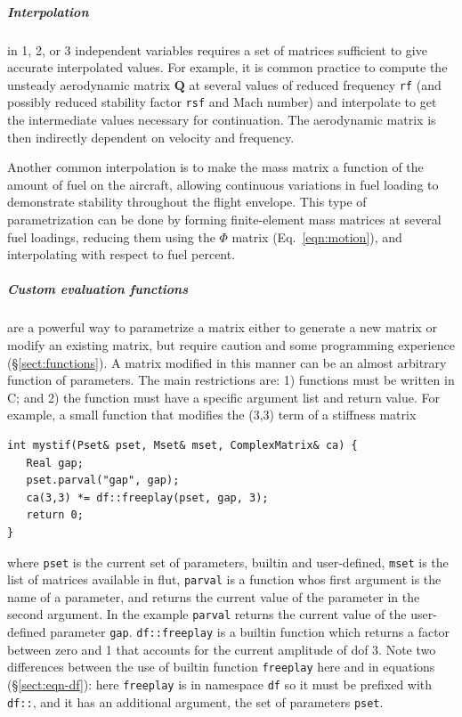\documentclass[10pt,openany,twoside]{book}
\numberwithin{equation}{section}   %
\def\Cpp{{C\nolinebreak[4]\hspace{-.05em}\raisebox{.4ex}{\tiny\bf ++}}\:}
\newcommand{\Cmd}[1]{{\sf #1}}
\newcommand{\Code}[1]{{\small\tt #1}}
\newcommand{\Matrix}[1]{\boldsymbol{#1}}
\newcommand{\Sectref}[1]{\S\ref{#1}}
\newcommand{\Eqn}[1]{Eq.\ \ref{#1}}
\begin{document}
\subparagraph{Interpolation} in 1, 2, or 3 independent variables
requires a set of matrices sufficient to give accurate interpolated
values.
For example, it is common practice to compute
the unsteady aerodynamic matrix $\Matrix{Q}$ at several values of
reduced frequency \Code{rf} (and possibly reduced stability factor
\Code{rsf} and Mach number) and interpolate to get the
intermediate values necessary for continuation. The aerodynamic matrix is
then indirectly dependent on velocity and frequency.

Another common interpolation is to make the mass matrix a function
of the amount of fuel on the aircraft, allowing continuous variations
in fuel loading to demonstrate stability throughout the flight envelope.
This type of parametrization can be done by forming finite-element
mass matrices at several fuel loadings, reducing them using the
$\Phi$ matrix (\Eqn{eqn:motion}), and interpolating with respect to
\index{=Phi@$\Matrix{\Phi}$!parametrizing with}
fuel percent.

\subparagraph{Custom evaluation functions} are a
powerful way to parametrize a matrix either to generate a new matrix
or modify an existing matrix,
but require caution and some programming experience (\Sectref{sect:functions}).
A matrix modified in this manner can be an almost arbitrary function
of parameters. The main restrictions are: 1) functions must be written in \Cpp;
and 2) the function must have a specific argument list and return value.
For example, a small function that modifies the (3,3) term of a stiffness matrix
\begin{lstlisting}
int mystif(Pset& pset, Mset& mset, ComplexMatrix& ca) {
   Real gap;
   pset.parval("gap", gap);
   ca(3,3) *= df::freeplay(pset, gap, 3);
   return 0;
}
\end{lstlisting}
where \Code{pset} is the current set of parameters, builtin and user-defined,
\Code{mset} is the list of matrices available in \Cmd{flut},
\Code{parval} is a function whos first argument is the name of a parameter,
and returns the current value of the parameter in the second argument.
In the example \Code{parval} returns the current value of the
user-defined parameter \Code{gap}.
\Code{df::freeplay} is a builtin function which returns a factor between
zero and 1 that accounts for the current amplitude of dof 3.
Note two differences between the use of builtin function \Code{freeplay}
here and in equations (\Sectref{sect:eqn-df}): here \Code{freeplay} is
in namespace \Code{df} so it must be prefixed with \Code{df::}, and
it has an additional argument, the set of parameters \Code{pset}.
\end{document}
